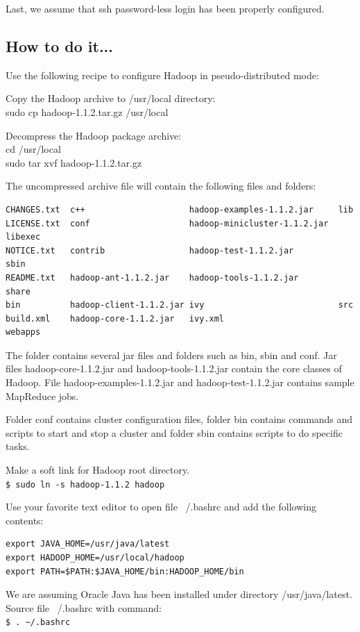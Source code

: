 Last, we assume that ssh password-less login has been properly configured.
\subsection*{How to do it...}
Use the following recipe to configure Hadoop in pseudo-distributed mode:

Copy the Hadoop archive to /usr/local directory: \\
sudo cp hadoop-1.1.2.tar.gz /usr/local

Decompress the Hadoop package archive: \\
cd /usr/local \\
sudo tar xvf hadoop-1.1.2.tar.gz

The uncompressed archive file will contain the following files and folders:
\begin{verbatim}
CHANGES.txt  c++                     hadoop-examples-1.1.2.jar     lib
LICENSE.txt  conf                    hadoop-minicluster-1.1.2.jar  libexec
NOTICE.txt   contrib                 hadoop-test-1.1.2.jar         sbin
README.txt   hadoop-ant-1.1.2.jar    hadoop-tools-1.1.2.jar        share
bin          hadoop-client-1.1.2.jar ivy                           src
build.xml    hadoop-core-1.1.2.jar   ivy.xml                       webapps
\end{verbatim}
The folder contains several jar files and folders such as bin, sbin and conf. Jar files hadoop-core-1.1.2.jar and hadoop-tools-1.1.2.jar contain the core classes of Hadoop. File hadoop-examples-1.1.2.jar and hadoop-test-1.1.2.jar contains sample MapReduce jobs.

Folder conf contains cluster configuration files, folder bin contains commands and scripts to start and stop a cluster and folder sbin contains scripts to do specific tasks.

Make a soft link for Hadoop root directory. \\
\verb|$ sudo ln -s hadoop-1.1.2 hadoop|

Use your favorite text editor to open file ~/.bashrc and add the following contents: 
\begin{verbatim}
export JAVA_HOME=/usr/java/latest
export HADOOP_HOME=/usr/local/hadoop
export PATH=$PATH:$JAVA_HOME/bin:HADOOP_HOME/bin
\end{verbatim}

We are assuming Oracle Java has been installed under directory /usr/java/latest. \\
Source file ~/.bashrc with command: \\
\verb|$ . ~/.bashrc|

